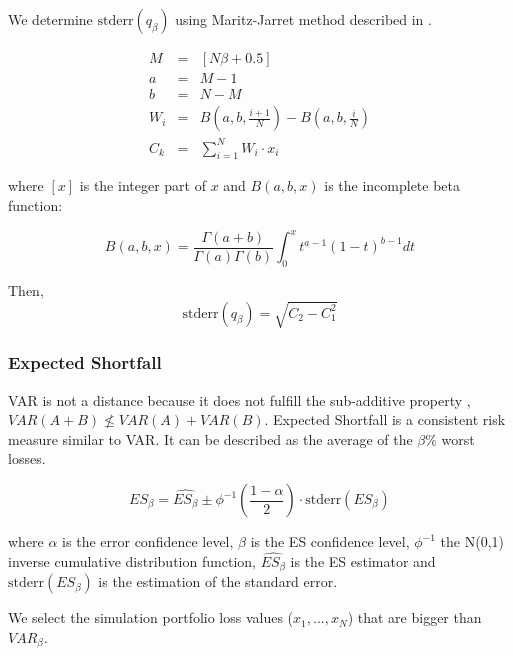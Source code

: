 \documentclass[a4paper,12pt,final]{article}
\begin{document}
We determine $\textrm{stderr}(q_{\beta})$ using Maritz-Jarret method described
in \cite{quant:algor}.

\begin{eqnarray}
M   & = & [N \beta + 0.5] \nonumber \\
a   & = & M - 1 \nonumber \\
b   & = & N - M \nonumber \\
W_i & = & B(a,b,\frac{i+1}{N}) - B(a,b,\frac{i}{N}) \nonumber \\
C_k & = & \sum_{i=1}^{N} W_i \cdot x_i \nonumber
\end{eqnarray}

where $[x]$ is the integer part of $x$ and $B(a,b,x)$ is the incomplete beta 
function:

\begin{displaymath}
B(a,b,x)=\frac{\Gamma(a+b)}{\Gamma(a)\Gamma(b)}\int_0^x t^{a-1} (1-t)^{b-1} dt
\end{displaymath}

Then,
\begin{displaymath}
\textrm{stderr}(q_{\beta}) = \sqrt{C_2 - C_1^2}
\end{displaymath}

\subsubsection{Expected Shortfall}
VAR is not a distance because it does not fulfill the sub-additive property 
\cite{var:varbad}, $VAR(A+B) \nleq VAR(A)+VAR(B)$. Expected Shortfall is a 
consistent risk measure \cite{var:eshortfall} similar to VAR. It can be described
as the average of the $\beta\%$ worst losses.

\begin{displaymath}
ES_{\beta} = \widehat{ES_{\beta}} \pm \phi^{-1}\left(\frac{1-\alpha}{2}\right) \cdot \textrm{stderr}(ES_{\beta})
\end{displaymath}

where $\alpha$ is the error confidence level, $\beta$ is the ES confidence 
level, $\phi^{-1}$ the N(0,1) inverse cumulative distribution function, 
$\widehat{ES_{\beta}}$ is the ES estimator and $\textrm{stderr}(ES_{\beta})$
is the estimation of the standard error.
\newline

We select the simulation portfolio loss values ($x_1, ..., x_N$) that are bigger 
than $VAR_{\beta}$.
\end{document}
